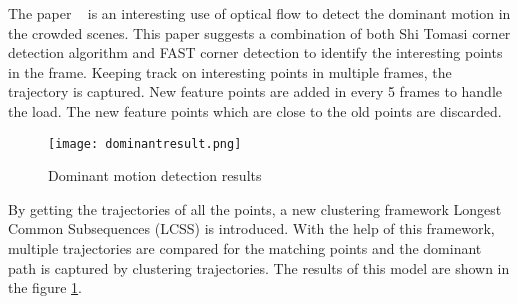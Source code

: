 The paper ~\cite{4629878} is an interesting use of optical flow to detect the dominant motion in the crowded scenes. This paper suggests a combination of both Shi Tomasi corner detection algorithm and FAST corner detection to identify the  interesting points in the frame. Keeping track on interesting points in multiple frames, the trajectory is captured. New feature points are added in every 5 frames to handle the load. The new feature points which are close to the old points are discarded. 
\begin{figure}[tb]
	\center\texttt{[image: dominantresult.png]}
	\caption{Dominant motion detection results}
	\label{fig:dominantresult}
\end{figure}
By getting the trajectories of all the points, a new clustering framework Longest Common Subsequences (LCSS) is introduced. With the help of this framework, multiple trajectories are compared for the matching points and the dominant path is captured by clustering trajectories. The results of this model are shown in the figure \ref{fig:dominantresult}.
 